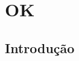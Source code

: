 \documentclass{workbook}
\author{gustavovital}
\begin{document}
\capa

\chapter{OK}
\section{Introdução}
\lipsum[1-15]
\end{document}
